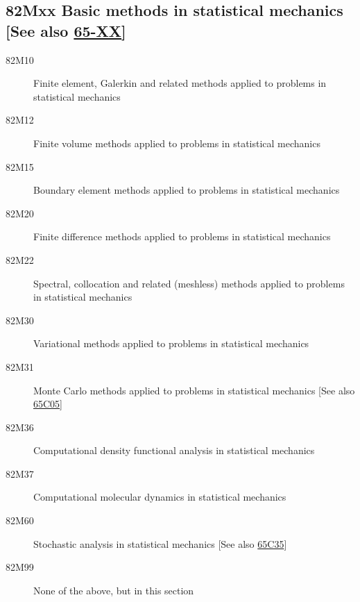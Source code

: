 \documentclass[letterpaper]{article}
\begin{document}
\subsection*{82Mxx  Basic methods in statistical mechanics [See also \hyperref[65-XX]{65-XX}] }\label{82Mxx}
\begin{description}  
\item [82M10]\label{82M10} Finite element, Galerkin and related methods applied to problems in statistical mechanics
\item [82M12]\label{82M12} Finite volume methods applied to problems in statistical mechanics
\item [82M15]\label{82M15} Boundary element methods applied to problems in statistical mechanics
\item [82M20]\label{82M20} Finite difference methods applied to problems in statistical mechanics
\item [82M22]\label{82M22} Spectral, collocation and related (meshless) methods applied to problems in statistical mechanics
\item [82M30]\label{82M30} Variational methods applied to problems in statistical mechanics
\item [82M31]\label{82M31} Monte Carlo methods applied to problems in statistical mechanics [See also \hyperref[65C05]{65C05}]
\item [82M36]\label{82M36} Computational density functional analysis in statistical mechanics
\item [82M37]\label{82M37} Computational molecular dynamics in statistical mechanics
\item [82M60]\label{82M60} Stochastic analysis in statistical mechanics [See also \hyperref[65C35]{65C35}]
\item [82M99]\label{82M99} None of the above, but in this section
\end{description}
\end{document}
